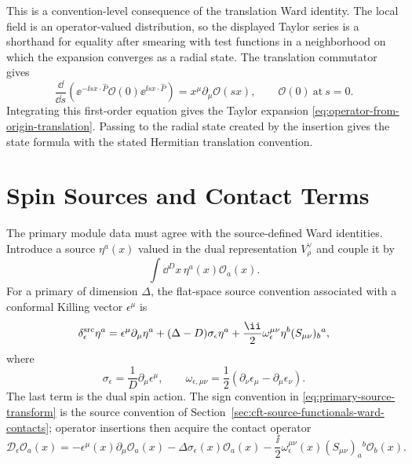 This is a convention-level consequence of the translation Ward identity.  The
local field is an operator-valued distribution, so the displayed Taylor series
is a shorthand for equality after smearing with test functions in a
neighborhood on which the expansion converges as a radial state.  The
translation commutator gives
\[
  \frac{\dd}{\dd s}
  \left(
    \ee^{-\ii s x\cdot\widehat P}\mathcal O(0)
    \ee^{\ii s x\cdot\widehat P}
  \right)
  =
  x^\mu\partial_\mu\mathcal O(sx),
  \qquad
  \mathcal O(0)\ \text{at}\ s=0.
\]
Integrating this first-order equation gives the Taylor expansion
\eqref{eq:operator-from-origin-translation}.  Passing to the radial state
created by the insertion gives the state formula with the stated Hermitian
translation convention.

\section{Spin Sources and Contact Terms}
\label{sec:primary-spin-sources-contact-terms}

\begin{definition}
\label{def:primary-spin-source-contact-operator}
The primary module data must agree with the source-defined Ward identities.
Introduce a source \(\eta^a(x)\) valued in the dual representation
\(V_\rho^\vee\) and couple it by
\[
  \int\dd^D x\,\eta^a(x)\mathcal O_a(x).
\]
For a primary of dimension \(\Delta\), the flat-space source convention
associated with a conformal Killing vector \(\epsilon^\mu\) is
\begin{equation}
  \delta_\epsilon^{\rm src}\eta^a
  =
  \epsilon^\mu\partial_\mu\eta^a
  +
  (\Delta-D)\sigma_\epsilon\eta^a
  +
  \frac{\ii}{2}\omega_\epsilon^{\mu\nu}
  \eta^b(S_{\mu\nu})_b{}^a ,
  \label{eq:primary-source-transform}
\end{equation}
where
\[
  \sigma_\epsilon=\frac1D\partial_\mu\epsilon^\mu,
  \qquad
  \omega_{\epsilon,\mu\nu}
  =
  \frac12(\partial_\nu\epsilon_\mu-\partial_\mu\epsilon_\nu).
\]
The last term is the dual spin action.  The sign convention in
\eqref{eq:primary-source-transform} is the source convention of
Section~\ref{sec:cft-source-functionals-ward-contacts}; operator insertions
then acquire the contact operator
\begin{equation}
  \mathcal D_\epsilon\mathcal O_a(x)
  =
  -\epsilon^\mu(x)\partial_\mu\mathcal O_a(x)
  -\Delta\sigma_\epsilon(x)\mathcal O_a(x)
  -\frac{\ii}{2}\omega_\epsilon^{\mu\nu}(x)
  (S_{\mu\nu})_a{}^b\mathcal O_b(x).
  \label{eq:primary-contact-operator}
\end{equation}
\end{definition}

